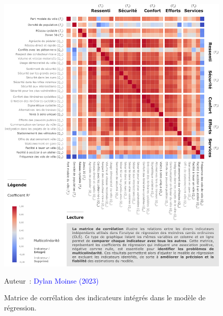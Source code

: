 \begin{refsegment}
    \begin{figure}[h!]\vspace*{4pt}
        \caption{Matrice de corrélation des indicateurs intégrés dans le modèle de régression.}
        \label{fig-chap4:matrice-autocorrelation}
        \centerline{\includegraphics[width=1\columnwidth]{src/Figures/Chap-4/FR_Matrice_Autocorrelation_OLS.pdf}}
        \vspace{5pt}
        \begin{flushright}\scriptsize{
        Auteur~: \textcolor{blue}{Dylan Moinse (2023)}
        }\end{flushright}
    \end{figure}


\end{refsegment}
